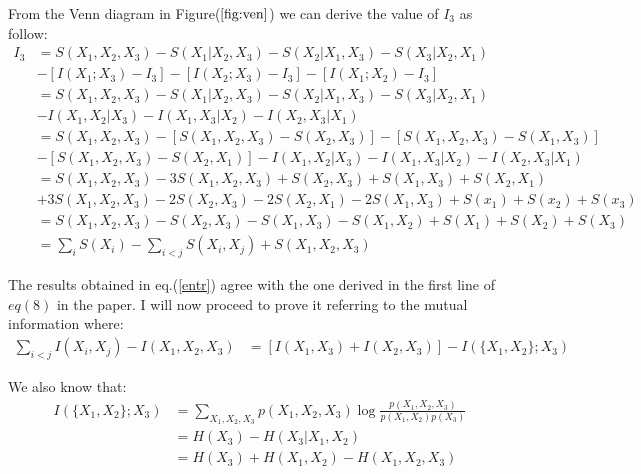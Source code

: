 \documentclass[11pt]{article}
\makeatletter
\newenvironment{proofw}{\par
	\pushQED{\qed}%
	\normalfont \topsep6\p@\@plus6\p@\relax
	\trivlist
	\item[]\ignorespaces
}{%
	\popQED\endtrivlist\@endpefalse
}
\makeatother
\begin{document}
\begin{proofw}
	
	From the Venn diagram in Figure($\ref{fig:ven}$) we can derive the value of $I_{3}$ as follow:
\begin{equation}\label{entr}
\begin{split}
I_{3} &= S(X_{1},X_{2},X_{3}) - S(X_{1}|X_{2},X_{3}) - S(X_{2}|X_{1},X_{3})- S(X_{3}|X_{2},X_{1})\\
& - [I(X_{1};X_{3})- I_{3}] -  [I(X_{2};X_{3})-I_{3}] - [I(X_{1};X_{2})-I_{3}]\\
&= S(X_{1},X_{2},X_{3}) - S(X_{1}|X_{2},X_{3}) - S(X_{2}|X_{1},X_{3})- S(X_{3}|X_{2},X_{1})\\
& - I(X_{1},X_{2}|X_{3}) - I(X_{1},X_{3}|X_{2})  - I(X_{2},X_{3}|X_{1})\\
&= S(X_{1},X_{2},X_{3}) - [S(X_{1},X_{2},X_{3})-S(X_{2},X_{3})] - [S(X_{1},X_{2},X_{3})-S(X_{1},X_{3})] \\
& - [S(X_{1},X_{2},X_{3})-S(X_{2},X_{1})] - I(X_{1},X_{2}|X_{3}) - I(X_{1},X_{3}|X_{2})  - I(X_{2},X_{3}|X_{1})\\
&= S(X_{1},X_{2},X_{3}) - 3 S(X_{1},X_{2},X_{3}) +S(X_{2},X_{3}) + S(X_{1},X_{3}) + S(X_{2},X_{1}) \\
& + 3 S(X_{1},X_{2},X_{3}) -2S(X_{2},X_{3}) -2S(X_{2},X_{1}) -2S(X_{1},X_{3}) +S(x_{1})+S(x_{2})+S(x_{3})\\
&= S(X_{1},X_{2},X_{3}) -S(X_{2},X_{3}) - S(X_{1},X_{3}) - S(X_{1},X_{2}) + S(X_{1})+S(X_{2})+S(X_{3})\\
&= \sum_{i}S(X_{i}) - \sum_{i<j}S(X_{i},X_{j}) + S(X_{1},X_{2},X_{3})
\end{split}
\end{equation}

The results obtained in eq.(\ref{entr}) agree with the one derived in the first line of $eq(8)$ in the paper. I will now proceed to prove it referring to the mutual information where:
\begin{equation*}
\begin{split}
\sum_{i<j}I(X_{i},X_{j}) - I(X_{1},X_{2},X_{3}) &= [I(X_{1},X_{3})+I(X_{2},X_{3})] - I(\{X_{1},X_{2}\};X_{3})
\end{split}
\end{equation*}

We also know that:
\begin{equation*}
\begin{split}
 I(\{X_{1},X_{2}\};X_{3})& = \sum_{X_{1},X_{2},X_{3}}p(X_{1},X_{2},X_{3})\log\frac{p(X_{1},X_{2},X_{3})}{p(X_{1},X_{2})p(X_{3})}\\
 & = H(X_{3}) - H(X_{3}|X_{1},X_{2}) \\
 & = H(X_{3}) + H(X_{1},X_{2}) - H(X_{1},X_{2},X_{3})  
\end{split}
\end{equation*}


\end{proofw}
\end{document}
